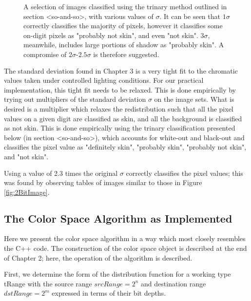 {\begin{figure}[h!]
      \caption{A selection of images classified using the trinary method outlined in section <so-and-so>, with various values of $\sigma$. It can be seen that $1\sigma$ correctly classifies the majority of pixels, however it classifies some on-digit pixels as "probably not skin", and even "not skin". $3\sigma$, meanwhile, includes large portions of shadow as "probably skin". A compromise of $2\sigma$-$2.5\sigma$ is therefore suggested.} \label{fig:RelaxedSigma}
  \end{figure}
  \clearpage
  }
  
  The standard deviation found in Chapter 3 is a very tight fit to the chromatic values taken under controlled lighting conditions. For our practical implementation, this tight fit needs to be relaxed. This is done empirically by trying out multipliers of the standard deviation $\sigma$ on the image sets. What is desired is a multiplier which relaxes the redistribution such that all the pixel values on a given digit are classified as skin, and all the background is classified as not skin. This is done empirically using the trinary classification presented below (in section <so-and-so>), which accounts for white-out and black-out and classifies the pixel value as "definitely skin", "probably skin", "probably not skin", and "not skin".
  
  Using a value of 2.3 times the original $\sigma$ correctly classifies the pixel values; this was found by observing tables of images similar to those in Figure \ref{fig:2BitImage}. 
  
  
  \subsection{The Color Space Algorithm as Implemented}\label{sec:ColorSpaceAlgorithmAsImplemented}
  Here we present the color space algorithm in a way which most closely resembles the C++ code. The construction of the color space object is described at the end of Chapter 2; here, the operation of the algorithm is described.
  
  First, we determine the form of the distribution function for a working type tRange with the source range $srcRange=2^n$  and destination range $dstRange=2^m$ expressed in terms of their bit depths.
  
